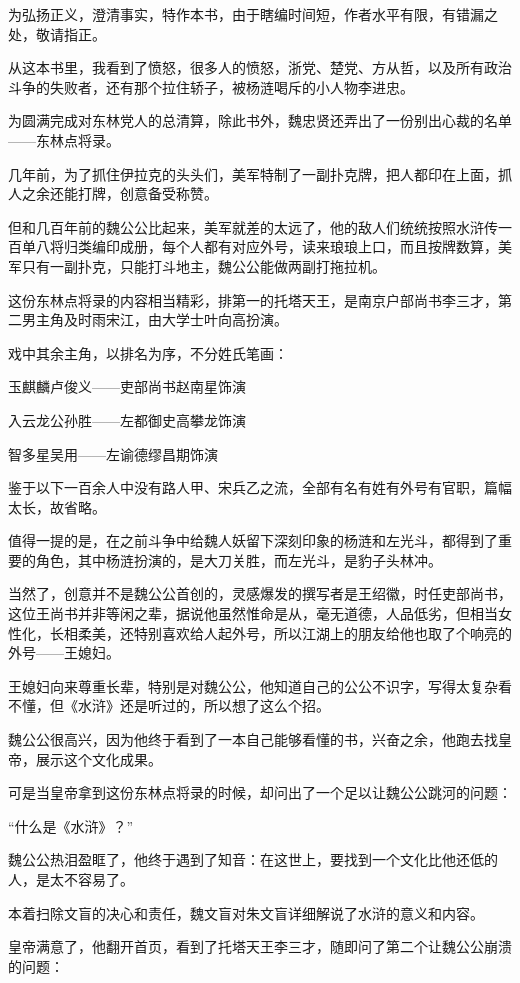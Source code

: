 \begin{multicols}{\theparacolNo}
为弘扬正义，澄清事实，特作本书，由于瞎编时间短，作者水平有限，有错漏之处，敬请指正。

从这本书里，我看到了愤怒，很多人的愤怒，浙党、楚党、方从哲，以及所有政治斗争的失败者，还有那个拉住轿子，被杨涟喝斥的小人物李进忠。

为圆满完成对东林党人的总清算，除此书外，魏忠贤还弄出了一份别出心裁的名单——东林点将录。

几年前，为了抓住伊拉克的头头们，美军特制了一副扑克牌，把人都印在上面，抓人之余还能打牌，创意备受称赞。

但和几百年前的魏公公比起来，美军就差的太远了，他的敌人们统统按照水浒传一百单八将归类编印成册，每个人都有对应外号，读来琅琅上口，而且按牌数算，美军只有一副扑克，只能打斗地主，魏公公能做两副打拖拉机。

这份东林点将录的内容相当精彩，排第一的托塔天王，是南京户部尚书李三才，第二男主角及时雨宋江，由大学士叶向高扮演。

戏中其余主角，以排名为序，不分姓氏笔画：

玉麒麟卢俊义——吏部尚书赵南星饰演

入云龙公孙胜——左都御史高攀龙饰演

智多星吴用——左谕德缪昌期饰演

鉴于以下一百余人中没有路人甲、宋兵乙之流，全部有名有姓有外号有官职，篇幅太长，故省略。

值得一提的是，在之前斗争中给魏人妖留下深刻印象的杨涟和左光斗，都得到了重要的角色，其中杨涟扮演的，是大刀关胜，而左光斗，是豹子头林冲。

当然了，创意并不是魏公公首创的，灵感爆发的撰写者是王绍徽，时任吏部尚书，这位王尚书并非等闲之辈，据说他虽然惟命是从，毫无道德，人品低劣，但相当女性化，长相柔美，还特别喜欢给人起外号，所以江湖上的朋友给他也取了个响亮的外号——王媳妇。

王媳妇向来尊重长辈，特别是对魏公公，他知道自己的公公不识字，写得太复杂看不懂，但《水浒》还是听过的，所以想了这么个招。

魏公公很高兴，因为他终于看到了一本自己能够看懂的书，兴奋之余，他跑去找皇帝，展示这个文化成果。

可是当皇帝拿到这份东林点将录的时候，却问出了一个足以让魏公公跳河的问题：

“什么是《水浒》？”

魏公公热泪盈眶了，他终于遇到了知音：在这世上，要找到一个文化比他还低的人，是太不容易了。

本着扫除文盲的决心和责任，魏文盲对朱文盲详细解说了水浒的意义和内容。

皇帝满意了，他翻开首页，看到了托塔天王李三才，随即问了第二个让魏公公崩溃的问题：


\end{multicols}
